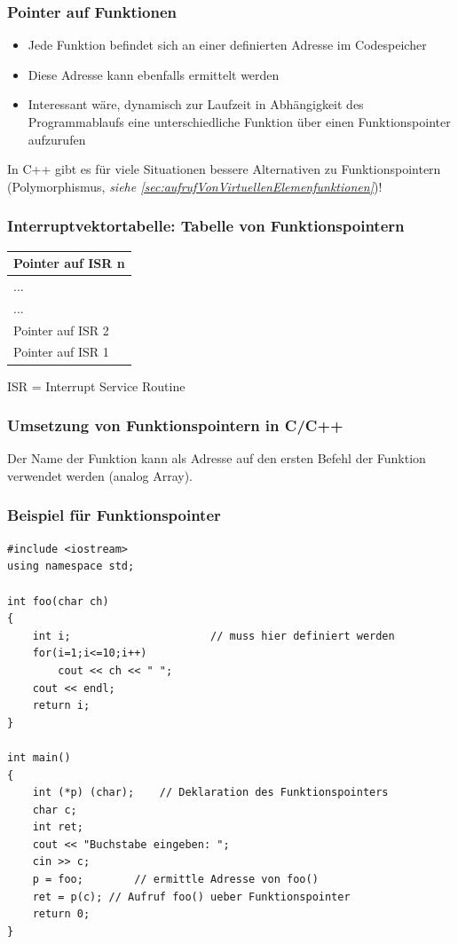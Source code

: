 \begin{multicols}{2}
\subsubsection{Pointer auf Funktionen}
\begin{itemize}
	\item Jede Funktion befindet sich an einer definierten Adresse im Codespeicher
	\item Diese Adresse kann ebenfalls ermittelt werden
	\item Interessant wäre, dynamisch zur Laufzeit in Abhängigkeit des Programmablaufs eine unterschiedliche Funktion über einen Funktionspointer aufzurufen
\end{itemize}
\begin{hinweis}
In C++ gibt es für viele Situationen bessere Alternativen zu Funktionspointern (Polymorphismus, \emph{siehe \ref{sec:aufrufVonVirtuellenElemenfunktionen}})!
\end{hinweis}

\subsubsection{Interruptvektortabelle: Tabelle von Funktionspointern}
\centering
\begin{tabularx}{0.25\textwidth}{|X|}
	\hline
	Pointer auf ISR n\\
	\hline
	...\\
	\hline
	...\\
	\hline
	Pointer auf ISR 2\\
	\hline
	Pointer auf ISR 1\\
	\hline
\end{tabularx}
\flushleft
ISR = Interrupt Service Routine
\vfill\null
\end{multicols}

\subsubsection{Umsetzung von Funktionspointern in C/C++}
Der Name der Funktion kann als Adresse auf den ersten Befehl der Funktion verwendet werden (analog Array).

\subsubsection{Beispiel für Funktionspointer}
\vspace{-\baselineskip}
\begin{minipage}{0.7\linewidth}
\begin{lstlisting}
#include <iostream>
using namespace std;

int foo(char ch)
{
	int i;						// muss hier definiert werden
	for(i=1;i<=10;i++)
		cout << ch << " ";
	cout << endl;
	return i;
}

int main()
{
	int (*p) (char);	// Deklaration des Funktionspointers
	char c;
	int ret;
	cout << "Buchstabe eingeben: ";
	cin >> c;
	p = foo;		// ermittle Adresse von foo()
	ret = p(c);	// Aufruf foo() ueber Funktionspointer
	return 0;
}
\end{lstlisting}
\end{minipage}


